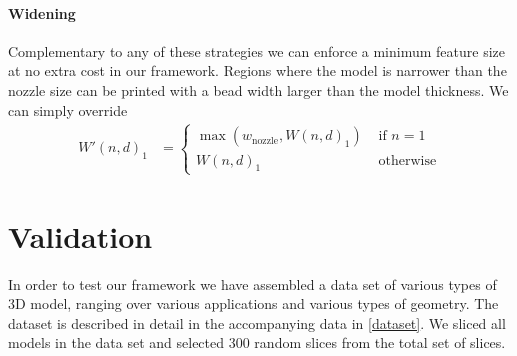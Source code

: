 \paragraph{Widening}
Complementary to any of these strategies we can enforce a minimum feature size at no extra cost in our framework.
Regions where the model is narrower than the nozzle size can be printed with a bead width larger than the model thickness.
We can simply override
\begin{align*}
W'(n,d)_1 &=
\begin{cases}
\max \left( w_\text{nozzle}  ,  W(n,d)_1 \right) & \text{ if } n = 1 \\
W(n,d)_1 & \text{ otherwise}
\end{cases}
\end{align*}




















\section{Validation}
In order to test our framework we have assembled a data set of various types of 3D model, ranging over various applications and various types of geometry.
The dataset is described in detail in the accompanying data in \cref{dataset}.
We sliced all models in the data set and selected 300 random slices from the total set of slices.



